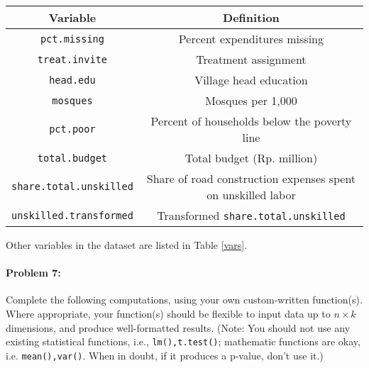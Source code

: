 \documentclass{article}
\begin{document}
\begin{table*}[h]
  \caption{Variables \label{vars}}
  \centering
  \begin{tabular}{c|c}
    \hline \textbf{Variable} & \textbf{Definition}\\ \hline
    \texttt{pct.missing} & Percent expenditures missing\\
    \texttt{treat.invite} & Treatment assignment \\ 
    \texttt{head.edu} & Village head education \\
    \texttt{mosques} & Mosques per 1,000 \\
    \texttt{pct.poor} & Percent of households below the poverty line\\
    \texttt{total.budget} & Total budget (Rp. million)\\
    \texttt{share.total.unskilled} & Share of road construction expenses spent on
    unskilled labor\\
    \texttt{unskilled.transformed} & Transformed \texttt{share.total.unskilled}
   \end{tabular}
\end{table*}
Other variables in the dataset are listed in Table \ref{vars}. 





\paragraph{Problem 7:} Complete the following computations, using your
own custom-written function(s). Where appropriate, your function(s)
should be flexible to input data up to $n\times k$ dimensions, and
produce well-formatted results.  (Note: You should not use any existing
statistical functions, i.e., \texttt{lm(),t.test()}; mathematic
functions are okay, i.e. \texttt{mean(),var()}.  When in doubt, if it
produces a p-value, don't use it.)
\end{document}
